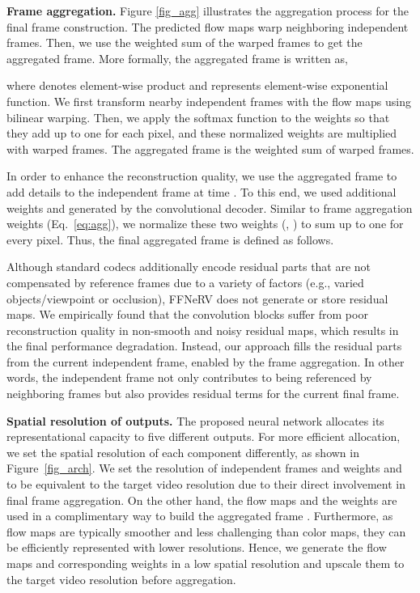 \documentclass[sigconf]{acmart}
\begin{document}
\noindent\textbf{Frame aggregation.} Figure \ref{fig_agg} illustrates the aggregation process for the final frame construction.
The predicted flow maps warp neighboring independent frames.
Then, we use the weighted sum of the warped frames to get the aggregated frame.
More formally, the aggregated frame  is written as,
\begin{small}

\end{small}
where  denotes element-wise product and  represents element-wise exponential function.
We first transform nearby independent frames with the flow maps using bilinear warping.
Then, we apply the softmax function to the weights so that they add up to one for each pixel, and these normalized weights are multiplied with warped frames.
The aggregated frame is the weighted sum of warped frames.

In order to enhance the reconstruction quality, we use the aggregated frame to add details to the independent frame at time .
To this end, we used additional weights  and  generated by the convolutional decoder.
Similar to frame aggregation weights (Eq.~\ref{eq:agg}), we normalize these two weights (, ) to sum up to one for every pixel.
Thus, the final aggregated frame is defined as follows.



Although standard codecs additionally encode residual parts that are not compensated by reference frames due to a variety of factors (e.g., varied objects/viewpoint or occlusion), FFNeRV does not generate or store residual maps.
We empirically found that the convolution blocks suffer from poor reconstruction quality in non-smooth and noisy residual maps, which results in the final performance degradation.
Instead, our approach fills the residual parts from the current independent frame, enabled by the frame aggregation.
In other words, the independent frame not only contributes to being referenced by neighboring frames but also provides residual terms for the current final frame.


\noindent\textbf{Spatial resolution of outputs.}
The proposed neural network allocates its representational capacity to five different outputs.
For more efficient allocation, we set the spatial resolution of each component differently, as shown in Figure~\ref{fig_arch}.
We set the resolution of independent frames  and weights  and  to be equivalent to the target video resolution due to their direct involvement in final frame aggregation.
On the other hand, the flow maps  and the weights  are used in a complimentary way to build the aggregated frame . 
Furthermore, as flow maps are typically smoother and less challenging than color maps, they can be efficiently represented with lower resolutions.
Hence, we generate the flow maps and corresponding weights in a low spatial resolution and upscale them to the target video resolution before aggregation.
\end{document}
